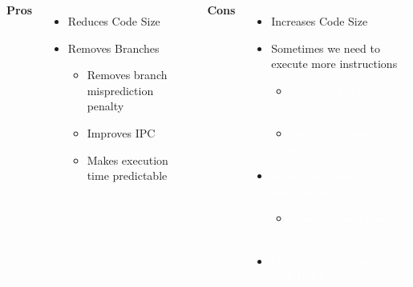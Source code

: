     \begin{columns}[t] %
            \textbf{Pros}
            \begin{itemize}
                \item Reduces Code Size
                \item Removes Branches
                \begin{itemize}
                    \item Removes branch misprediction penalty
                    \item Improves IPC
                    \item Makes execution time predictable
                \end{itemize}
            \end{itemize}

            \textbf{Cons}
            \begin{itemize}
                \item Increases Code Size
                \item Sometimes we need to execute more instructions
                \begin{itemize}
                    \item \textcolor{white}{Increases the I-Cache pressure}
                    \item \textcolor{white}{Increase pressure on registers}
                \end{itemize}
                \item \textcolor{white}{Makes the architecture more complex}
                \begin{itemize}
                    \item \textcolor{white}{More area and power consumption}
                \end{itemize}
                \item \textcolor{white}{Does not interact positively with OOO}
                
                
            \end{itemize}
    \end{columns}
    